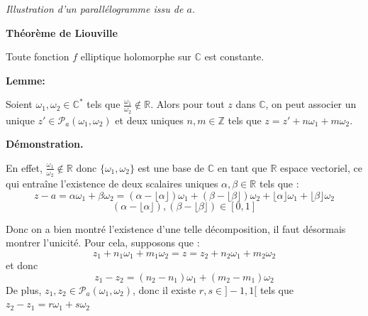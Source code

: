 \documentclass{article}
\begin{document}
\begin{center}
\end{center}
\begin{center}
\textit{Illustration d'un parallélogramme issu de $a$.}
\end{center}

\textbf{Théorème de Liouville \\}

    Toute fonction $f$ elliptique holomorphe sur $\mathbb{C}$ est constante.


\textbf{Lemme: \\}

    Soient $\omega_1, \omega_2 \in \mathbb{C}^{*}$ tels que $\frac{\omega_1}{\omega_2} \notin \mathbb{R}$. Alors pour tout $z$ dans $\mathbb{C}$, on peut associer un unique $z' \in \mathcal{P}_{a}{(\omega_1, \omega_2)}$ et deux uniques $n, m \in \mathbb{Z}$ tels que $z = z' + n \omega_1 + m \omega_2$.


\textbf{Démonstration.}

En effet, $\frac{\omega_1}{\omega_2} \notin \mathbb{R}$ donc $\{ \omega_1, \omega_2 \}$ est une base de $\mathbb{C}$ en tant que $\mathbb{R}$ espace vectoriel, ce qui entraîne l'existence de deux scalaires uniques $\alpha, \beta \in \mathbb{R}$ tels que :
\[
z - a = \alpha \omega_1 + \beta \omega_2 = (\alpha - \lfloor \alpha \rfloor) \omega_1 + (\beta - \lfloor \beta \rfloor) \omega_2 + \lfloor \alpha \rfloor \omega_1 + \lfloor \beta \rfloor \omega_2
\]
\[
    (\alpha - \lfloor \alpha \rfloor), (\beta - \lfloor \beta \rfloor)  \in [0, 1]
\]

Donc on a bien montré l'existence d'une telle décomposition, il faut désormais montrer l'unicité. Pour cela, supposons que :
\[
z_1 + n_1 \omega_1 + m_1 \omega_2 = z = z_2 + n_2 \omega_1 + m_2 \omega_2
\]
et donc
\[
z_1 - z_2 = (n_2 - n_1) \omega_1 + (m_2 - m_1) \omega_2
\]
De plus, $z_1, z_2 \in \mathcal{P}_{a}(\omega_1, \omega_2)$, donc il existe $r, s \in  ]-1, 1[$ tels que $z_2 - z_1 = r \omega_1 + s \omega_2$
\end{document}
